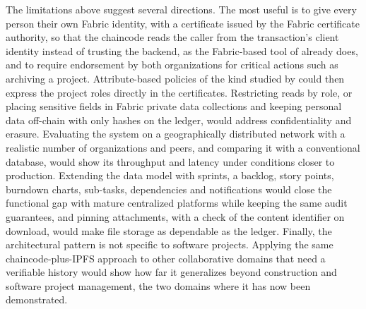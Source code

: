 The limitations above suggest several directions. The most useful is to give every person their own Fabric identity, with a certificate issued by the Fabric certificate authority, so that the chaincode reads the caller from the transaction's client identity instead of trusting the backend, as the Fabric-based tool of \textcite{batista2021} already does, and to require endorsement by both organizations for critical actions such as archiving a project. Attribute-based policies of the kind studied by \textcite{gordijn2022combining} could then express the project roles directly in the certificates. Restricting reads by role, or placing sensitive fields in Fabric private data collections and keeping personal data off-chain with only hashes on the ledger, would address confidentiality and erasure. Evaluating the system on a geographically distributed network with a realistic number of organizations and peers, and comparing it with a conventional database, would show its throughput and latency under conditions closer to production. Extending the data model with sprints, a backlog, story points, burndown charts, sub-tasks, dependencies and notifications would close the functional gap with mature centralized platforms while keeping the same audit guarantees, and pinning attachments, with a check of the content identifier on download, would make file storage as dependable as the ledger. Finally, the architectural pattern is not specific to software projects. Applying the same chaincode-plus-IPFS approach to other collaborative domains that need a verifiable history would show how far it generalizes beyond construction and software project management, the two domains where it has now been demonstrated.
